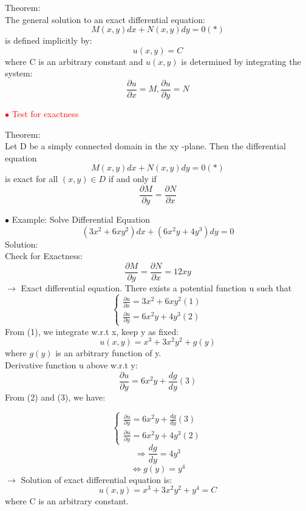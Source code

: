 \documentclass[12pt]{article}
\begin{document}
\begin{mybox}
    Theorem: \\
    The general solution to an exact differential equation:
     $$M(x,y)dx + N(x,y)dy = 0(*)$$
     is defined implicitly by:
     $$u(x,y) =C$$
     where C is an arbitrary constant and $u(x, y)$ is determined by
integrating the system:
 $$\frac{\partial u}{\partial x} = M,\frac{\partial u}{\partial y} =N$$
 
\end{mybox}
\textcolor{red}{$\bullet$ Test for exactness}
\\
\newpage 
\begin{mybox}
    Theorem: \\
    Let D be a simply connected domain in the xy -plane. Then the differential equation
     $$M(x,y)dx + N(x,y)dy = 0(*)$$
     is exact for all $(x, y) \in  D$ if and only if
     $$\frac{\partial M}{\partial y} = \frac{\partial N}{\partial x} $$
\end{mybox}
$\bullet$ Example: Solve Differential Equation
\\
$$(3x^2+6xy^2)dx + (6x^2y+ 4y^3)dy = 0$$
Solution: 
\\
Check for Exactness: 
$$\frac{\partial M}{\partial y} = \frac{\partial N}{\partial x} = 12xy$$
$\rightarrow$  Exact differential equation. There exists a
potential function u such that
$$\begin{cases}
    \frac{\partial u}{\partial x} = 3x^2+6xy^2  (1) \\
    \frac{\partial u}{\partial y} = 6x^2y+ 4y^3 (2)
  \end{cases}$$
From (1), we integrate w.r.t x, keep y as fixed: 
$$u(x,y) = x^3 + 3x^2y^2 +g(y)$$
where $g(y)$ is an arbitrary function of y.
\\
Derivative function u above w.r.t y: 
\\
$$\frac{\partial u}{\partial y}=6x^2y +\frac{dg}{dy}(3)$$
From (2) and (3), we have: 

$$\begin{cases}
    \frac{\partial u}{\partial y}=6x^2y +\frac{dg}{dy}(3) \\
    \frac{\partial u}{\partial y} = 6x^2y+ 4y^3 (2)
  \end{cases}$$
$$\Rightarrow \frac{dg}{dy} = 4y^3$$
$$\Leftrightarrow g(y) = y^4$$
$\rightarrow$ Solution of exact differential equation is: 
$$ u(x,y) = x^3 + 3x^2y^2 + y^4 = C $$
where C is an arbitrary constant. 
\end{document}

